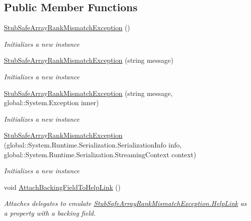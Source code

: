 \subsection*{Public Member Functions}
\begin{DoxyCompactItemize}
\item 
\hyperlink{class_system_1_1_runtime_1_1_interop_services_1_1_fakes_1_1_stub_safe_array_rank_mismatch_exception_ad800e48de00ef283d6912701f8e7b9a4}{Stub\-Safe\-Array\-Rank\-Mismatch\-Exception} ()
\begin{DoxyCompactList}\small\item\em Initializes a new instance\end{DoxyCompactList}\item 
\hyperlink{class_system_1_1_runtime_1_1_interop_services_1_1_fakes_1_1_stub_safe_array_rank_mismatch_exception_ae75b776051d586fa64eaa25dbd18f228}{Stub\-Safe\-Array\-Rank\-Mismatch\-Exception} (string message)
\begin{DoxyCompactList}\small\item\em Initializes a new instance\end{DoxyCompactList}\item 
\hyperlink{class_system_1_1_runtime_1_1_interop_services_1_1_fakes_1_1_stub_safe_array_rank_mismatch_exception_ae9166924d5f7735f02ccd0832114cd81}{Stub\-Safe\-Array\-Rank\-Mismatch\-Exception} (string message, global\-::\-System.\-Exception inner)
\begin{DoxyCompactList}\small\item\em Initializes a new instance\end{DoxyCompactList}\item 
\hyperlink{class_system_1_1_runtime_1_1_interop_services_1_1_fakes_1_1_stub_safe_array_rank_mismatch_exception_aea34e86efa5a744da5b4489804f2d0b1}{Stub\-Safe\-Array\-Rank\-Mismatch\-Exception} (global\-::\-System.\-Runtime.\-Serialization.\-Serialization\-Info info, global\-::\-System.\-Runtime.\-Serialization.\-Streaming\-Context context)
\begin{DoxyCompactList}\small\item\em Initializes a new instance\end{DoxyCompactList}\item 
void \hyperlink{class_system_1_1_runtime_1_1_interop_services_1_1_fakes_1_1_stub_safe_array_rank_mismatch_exception_a52f68fe0a1f7128e441e0c425715a414}{Attach\-Backing\-Field\-To\-Help\-Link} ()
\begin{DoxyCompactList}\small\item\em Attaches delegates to emulate \hyperlink{class_system_1_1_runtime_1_1_interop_services_1_1_fakes_1_1_stub_safe_array_rank_mismatch_exception_ae8b5f1d582e1048f0a43e19a38dfe591}{Stub\-Safe\-Array\-Rank\-Mismatch\-Exception.\-Help\-Link} as a property with a backing field.\end{DoxyCompactList}\item 

\end{DoxyCompactItemize}

